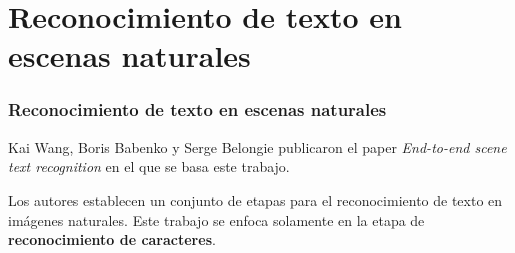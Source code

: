 \section{Reconocimiento de texto en escenas naturales}
	\begin{frame}
		\frametitle{Reconocimiento de texto en escenas naturales}
		Kai Wang, Boris Babenko y Serge Belongie publicaron el paper \textit{End-to-end scene text recognition} en el que se basa este trabajo.
		
		Los autores establecen un conjunto de etapas para el reconocimiento de texto en imágenes naturales. Este trabajo se enfoca solamente en la etapa de \textbf{reconocimiento de caracteres}.
		
	\end{frame}